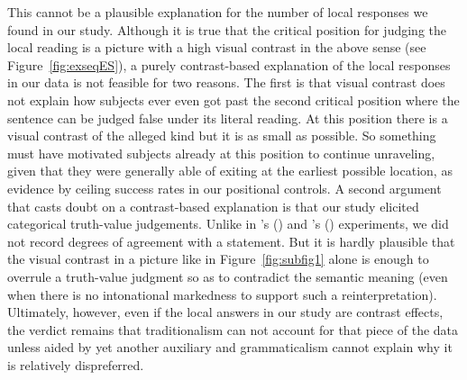 \documentclass[fleqn,reqno,10pt,draft]{article}
\begin{document}
This cannot be a plausible explanation for the number of local
responses we found in our study. Although it is true that the critical
position for judging the local reading is a picture with a high visual
contrast in the above sense (see Figure~\ref{fig:exseqES}), a purely
contrast-based explanation of the local responses in our data is not
feasible for two reasons. The first is that visual contrast does not
explain how subjects ever even got past the second critical position
where the sentence can be judged false under its literal reading. At
this position there is a visual contrast of the alleged kind but it is
as small as possible. So something must have motivated subjects
already at this position to continue unraveling, given that they were
generally able of exiting at the earliest possible location, as
evidence by ceiling success rates in our positional controls. A second
argument that casts doubt on a contrast-based explanation is that our
study elicited categorical truth-value judgements. Unlike in
\citeauthor{ChemlaSpector2010:Experimental-Ev}'s
(\citeyear{ChemlaSpector2010:Experimental-Ev}) and
\citeauthor{GeurtsTielvan-Tiel2013:Scalar-expressi}'s
(\citeyear{GeurtsTielvan-Tiel2013:Scalar-expressi}) experiments, we
did not record degrees of agreement with a statement. But it is hardly
plausible that the visual contrast in a picture like in
Figure~\ref{fig:subfig1} alone is enough to overrule a truth-value
judgment so as to contradict the semantic meaning (even when there is
no intonational markedness to support such a
reinterpretation). Ultimately, however, even if the local answers in
our study are contrast effects, the verdict remains that
traditionalism can not account for that piece of the data unless aided
by yet another auxiliary and grammaticalism cannot explain why it is
relatively dispreferred.

\end{document}
